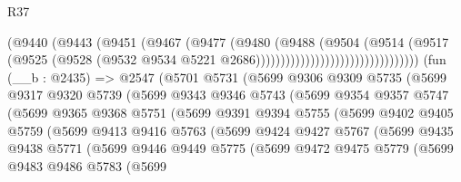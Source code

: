 \begin{lexlean}{R37}
\begin{coremodule}
                                            (@9440
                                              (@9443
                                                (@9451
                                                  (@9467
                                                    (@9477
                                                      (@9480
                                                        (@9488
                                                          (@9504
                                                            (@9514
                                                              (@9517
                                                                (@9525
                                                                  (@9528
                                                                    (@9532
                                                                      @9534
                                                                      @5221
                                                                      @2686)))))))))))))))))))))))))))))))))
    (fun (__b : @2435) =>
    @2547
      (@5701
        @5731
        (@5699
          @9306
          @9309
          @5735
          (@5699
            @9317
            @9320
            @5739
            (@5699
              @9343
              @9346
              @5743
              (@5699
                @9354
                @9357
                @5747
                (@5699
                  @9365
                  @9368
                  @5751
                  (@5699
                    @9391
                    @9394
                    @5755
                    (@5699
                      @9402
                      @9405
                      @5759
                      (@5699
                        @9413
                        @9416
                        @5763
                        (@5699
                          @9424
                          @9427
                          @5767
                          (@5699
                            @9435
                            @9438
                            @5771
                            (@5699
                              @9446
                              @9449
                              @5775
                              (@5699
                                @9472
                                @9475
                                @5779
                                (@5699
                                  @9483
                                  @9486
                                  @5783
                                  (@5699

\end{coremodule}
\end{lexlean}
